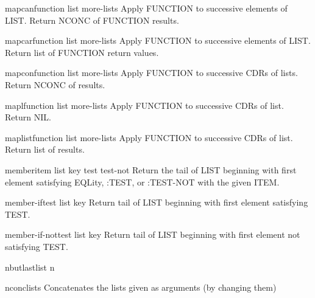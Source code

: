 \begin{function}{mapcan}{function list \rest more-lists}{}{}
  Apply FUNCTION to successive elements of LIST. Return NCONC of FUNCTION
   results.
\end{function}

\begin{function}{mapcar}{function list \rest more-lists}{}{}
  Apply FUNCTION to successive elements of LIST. Return list of FUNCTION
   return values.
\end{function}

\begin{function}{mapcon}{function list \rest more-lists}{}{}
  Apply FUNCTION to successive CDRs of lists. Return NCONC of results.
\end{function}

\begin{function}{mapl}{function list \rest more-lists}{}{}
  Apply FUNCTION to successive CDRs of list. Return NIL.
\end{function}

\begin{function}{maplist}{function list \rest more-lists}{}{}
  Apply FUNCTION to successive CDRs of list. Return list of results.
\end{function}

\begin{function}{member}{item list \key key test test-not}{}{}
  Return the tail of LIST beginning with first element satisfying EQLity,
   :TEST, or :TEST-NOT with the given ITEM.
\end{function}

\begin{function}{member-if}{test list \key key}{}{}
  Return tail of LIST beginning with first element satisfying TEST.
\end{function}

\begin{function}{member-if-not}{test list \key key}{}{}
  Return tail of LIST beginning with first element not satisfying TEST.
\end{function}

\begin{function}{nbutlast}{list \op n}{}{}
  
\end{function}

\begin{function}{nconc}{\rest lists}{}{}
  Concatenates the lists given as arguments (by changing them)
\end{function}

